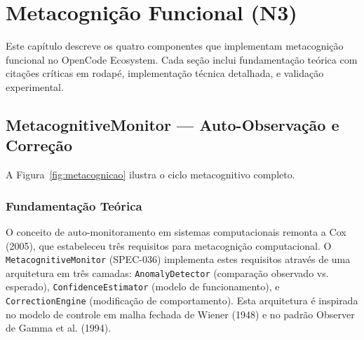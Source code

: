 \chapter{Metacognição Funcional (N3)}
\label{ch:metacognicao}

Este capítulo descreve os quatro componentes que implementam metacognição funcional no OpenCode Ecosystem. Cada seção inclui fundamentação teórica com citações críticas em rodapé, implementação técnica detalhada, e validação experimental.

\section{MetacognitiveMonitor — Auto-Observação e Correção}

A Figura~\ref{fig:metacognicao} ilustra o ciclo metacognitivo completo.



\subsection{Fundamentação Teórica}

O conceito de auto-monitoramento em sistemas computacionais remonta a Cox (2005), que estabeleceu três requisitos para metacognição computacional. O \texttt{MetacognitiveMonitor} (SPEC-036) implementa estes requisitos através de uma arquitetura em três camadas: \texttt{AnomalyDetector} (comparação observado vs. esperado), \texttt{ConfidenceEstimator} (modelo de funcionamento), e \texttt{CorrectionEngine} (modificação de comportamento). Esta arquitetura é inspirada no modelo de controle em malha fechada de Wiener (1948) e no padrão Observer de Gamma et al. (1994).

